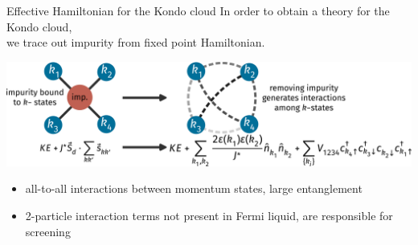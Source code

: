 \documentclass[10pt,aspectratio=169]{beamer}
\begin{document}
\begin{frame}{Effective Hamiltonian for the Kondo cloud}
In order to obtain a theory for the Kondo cloud,\\ we \alert{trace out impurity} from fixed point Hamiltonian.
\vspace*{\fill}

\includegraphics[width=\textwidth]{KondoCloud.pdf}

\vspace*{\fill}
\begin{itemize}
	\item all-to-all interactions between momentum states, \alert{large entanglement}
	\item 2-particle interaction terms \alert{not} present in Fermi liquid, are \alert{responsible for screening}
\end{itemize}

\end{frame}
\end{document}
